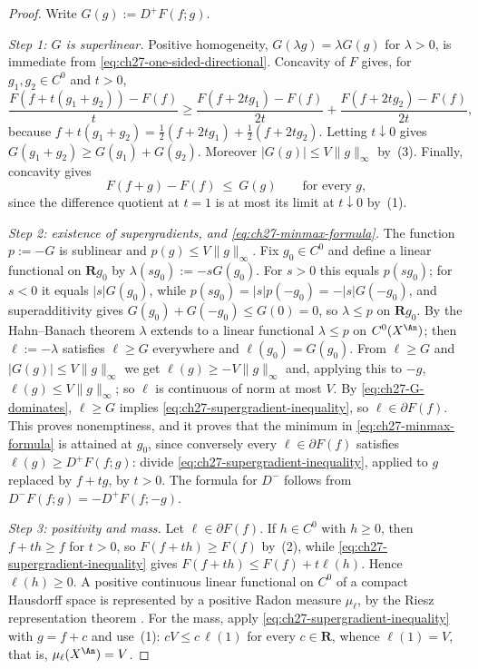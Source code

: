 \begin{proof}
Write \(G(g):=D^+F(f;g)\).

\emph{Step 1: \(G\) is superlinear.}
Positive homogeneity, \(G(\lambda g)=\lambda G(g)\) for \(\lambda>0\), is
immediate from \eqref{eq:ch27-one-sided-directional}.  Concavity of \(F\)
gives, for \(g_1,g_2\in C^0\) and \(t>0\),
\[
 \frac{F(f+t(g_1+g_2))-F(f)}{t}
 \geq\frac{F(f+2tg_1)-F(f)}{2t}+\frac{F(f+2tg_2)-F(f)}{2t},
\]
because \(f+t(g_1+g_2)=\tfrac12(f+2tg_1)+\tfrac12(f+2tg_2)\).  Letting
\(t\downarrow0\) gives \(G(g_1+g_2)\geq G(g_1)+G(g_2)\).  Moreover
\(|G(g)|\leq V\lVert g\rVert_\infty\) by
\,(3).  Finally, concavity gives
\begin{equation}\label{eq:ch27-G-dominates}
 F(f+g)-F(f)\ \leq\ G(g)
 \qquad\text{for every }g,
\end{equation}
since the difference quotient at \(t=1\) is at most its limit at
\(t\downarrow0\) by \,(1).

\emph{Step 2: existence of supergradients, and \eqref{eq:ch27-minmax-formula}.}
The function \(p:=-G\) is sublinear and \(p(g)\leq V\lVert g\rVert_\infty\).
Fix \(g_0\in C^0\) and define a linear functional on \(\mathbf Rg_0\) by
\(\lambda(sg_0):=-sG(g_0)\).  For \(s>0\) this equals \(p(sg_0)\); for
\(s<0\) it equals \(|s|G(g_0)\), while
\(p(sg_0)=|s|p(-g_0)=-|s|G(-g_0)\), and superadditivity gives
\(G(g_0)+G(-g_0)\leq G(0)=0\), so \(\lambda\leq p\) on \(\mathbf Rg_0\).  By
the Hahn--Banach theorem \(\lambda\) extends to a linear functional
\(\lambda\leq p\) on \(C^0(X^{\An})\); then \(\ell:=-\lambda\) satisfies
\(\ell\geq G\) everywhere and \(\ell(g_0)=G(g_0)\).  From \(\ell\geq G\) and
\(|G(g)|\leq V\lVert g\rVert_\infty\) we get
\(\ell(g)\geq-V\lVert g\rVert_\infty\) and, applying this to \(-g\),
\(\ell(g)\leq V\lVert g\rVert_\infty\); so \(\ell\) is continuous of norm at
most \(V\).  By \eqref{eq:ch27-G-dominates}, \(\ell\geq G\) implies
\eqref{eq:ch27-supergradient-inequality}, so \(\ell\in\partial F(f)\).  This
proves nonemptiness, and it proves that the minimum in
\eqref{eq:ch27-minmax-formula} is attained at \(g_0\), since conversely
every \(\ell\in\partial F(f)\) satisfies
\(\ell(g)\geq D^+F(f;g)\): divide
\eqref{eq:ch27-supergradient-inequality}, applied to \(g\) replaced by
\(f+tg\), by \(t>0\).  The formula for \(D^-\) follows from
\(D^-F(f;g)=-D^+F(f;-g)\).

\emph{Step 3: positivity and mass.}
Let \(\ell\in\partial F(f)\).  If \(h\in C^0\) with \(h\geq0\), then
\(f+th\geq f\) for \(t>0\), so \(F(f+th)\geq F(f)\) by
\,(2), while
\eqref{eq:ch27-supergradient-inequality} gives
\(F(f+th)\leq F(f)+t\ell(h)\).  Hence \(\ell(h)\geq0\).  A positive
continuous linear functional on \(C^0\) of a compact Hausdorff space is
represented by a positive Radon measure \(\mu_\ell\), by the Riesz
representation theorem .  For the mass, apply
\eqref{eq:ch27-supergradient-inequality} with \(g=f+c\) and use
\,(1):
\(cV\leq c\,\ell(1)\) for every \(c\in\mathbf R\), whence
\(\ell(1)=V\), that is, \(\mu_\ell(X^{\An})=V\).


\end{proof}
